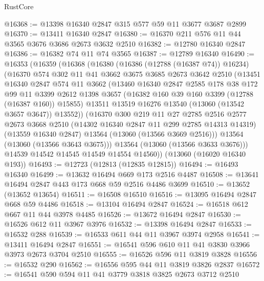 \begin{lexlean}{RustCore}
\begin{coremodule}
@16368 := @13398 @16340 @2847 @315 @577 @59 @11 @3677 @3687 @2899
@16370 := @13411 @16340 @2847
@16380 := @16370 @211 @576 @11 @44 @3565 @3676 @3686 @2673 @3632 @2510
@16382 := @12780 @16340 @2847
@16386 := @16382 @74 @11 @74 @3565
@16387 := @12789 @16340
@16490 := @16353
    (@16359
      (@16368
        (@16380
          (@16386 (@12788 (@16387 @74)) @16234)
          (@16370
            @574
            @302
            @11
            @41
            @3662
            @3675
            @3685
            @2673
            @3642
            @2510
            (@13451
              @16340
              @2847
              @574
              @11
              @3662
              (@13460
                @16340
                @2847
                @2585
                @178
                @38
                @172
                @99
                @11
                @3399
                @2612
                @1398
                @3657
                (@16382 @160 @39 @160 @3399 (@12788 (@16387 @160)) @15855)
                @13511
                @13519
                @16276
                @13540
                (@13060 (@13542 @3657 @3647))
                @13552))
            (@16370
              @300
              @219
              @11
              @27
              @2785
              @2516
              @2577
              @2673
              @3668
              @2510
              (@14302 @16340 @2847 @11 @299 @2785 @14313 @14319)
              (@13559 @16340 @2847)
              @13564
              (@13060 (@13566 @3669 @2516)))
            @13564
            (@13060 (@13566 @3643 @3675)))
          @13564
          (@13060 (@13566 @3633 @3676)))
        @14539
        @14542
        @14545
        @14549
        @14554
        @14560))
    (@13060 (@16020 @16340 @193))
@16493 := @12723 (@12813 (@12835 @12815))
@16494 := @16493 @16340
@16499 := @13632 @16494 @669 @173 @2516 @4487
@16508 := @13641 @16494 @2847 @443 @173 @668 @59 @2516 @4486 @3699
@16510 := @13652 (@13652 @13654)
@16511 := @16508 @16510
@16516 := @13095 @16494 @2847 @668 @59 @4486
@16518 := @13104 @16494 @2847
@16524 := @16518 @612 @667 @11 @44 @3978 @4485
@16526 := @13672 @16494 @2847
@16530 := @16526 @612 @11 @3967 @3976
@16532 := @13398 @16494 @2847
@16533 := @16532 @288
@16539 := @16533 @611 @44 @11 @3967 @3974 @2958
@16541 := @13411 @16494 @2847
@16551 := @16541 @596 @610 @11 @41 @3830 @3966 @3973 @2673 @3704 @2510
@16555 := @16526 @596 @11 @3819 @3828
@16556 := @16532 @290
@16562 := @16556 @595 @44 @11 @3819 @3826 @2837
@16572 := @16541 @590 @594 @11 @41 @3779 @3818 @3825 @2673 @3712 @2510

\end{coremodule}
\end{lexlean}
